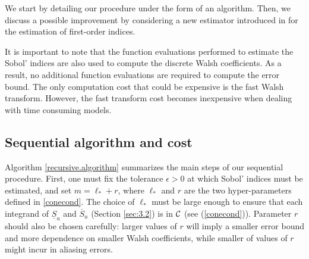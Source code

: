 We start by detailing our procedure under the form of an algorithm. Then, we discuss a possible improvement by considering a new estimator introduced in \cite{Owen} for the estimation of first-order indices.

It is important to note that the function evaluations performed to estimate the Sobol' indices are also used to compute the discrete Walsh coefficients. As a result, no additional function evaluations are required to compute the error bound. The only computation cost that could be expensive is the fast Walsh transform. However, the fast transform cost becomes inexpensive when dealing with time consuming models.

\subsection{Sequential algorithm and cost}
\label{sec:4.1}

Algorithm \ref{recursive.algorithm} summarizes the main steps of our sequential procedure. First, one must fix the tolerance $\epsilon >0$ at which Sobol' indices must be estimated, and set $m=\ell_*+r$, where $\ell_*$ and $r$ are the two hyper-parameters defined in \eqref{conecond}. The choice of $\ell_*$ must be large enough to ensure that each integrand of $\underline{S}_u$ and $\overline{S}_u$ (Section \ref{sec:3.2}) is in $\mathcal{C}$ (see  (\ref{conecond})). Parameter $r$ should also be chosen carefully: larger values of $r$ will imply a smaller error bound and more dependence on smaller Walsh coefficients, while smaller of values of $r$ might incur in aliasing errors.

